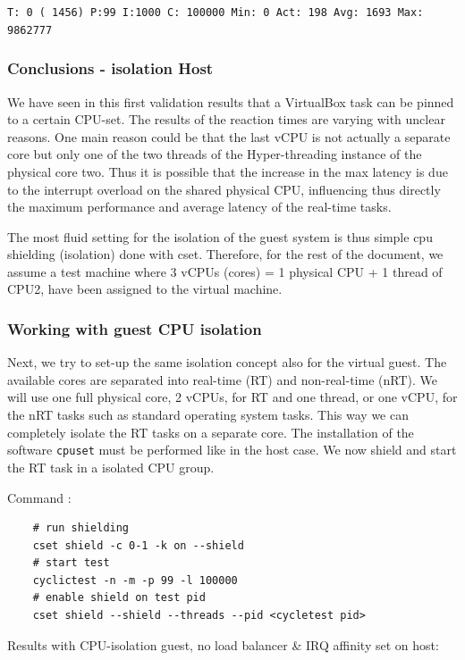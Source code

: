 \documentclass[]{scrartcl}
\begin{document}
\noindent \texttt{T: 0 ( 1456) P:99 I:1000 C: 100000 Min:      0 Act:  198 Avg: 1693 Max:  9862777}

\subsubsection{Conclusions - isolation Host}

We have seen in this first validation results that a VirtualBox task can be pinned to a certain CPU-set. The results of the reaction times are varying with unclear reasons. One main reason could be that the last vCPU is not actually a separate core but only one of the two threads of the Hyper-threading instance of the physical core two. Thus it is possible that the increase in the max latency is due to the interrupt overload on the shared physical CPU, influencing thus directly the maximum performance and average latency of the real-time tasks.

The most fluid setting for the isolation of the guest system is thus simple cpu shielding (isolation) done with cset. Therefore, for the rest of the document, we assume a test machine where 3 vCPUs (cores) = 1 physical CPU + 1 thread of CPU2, have been assigned to the virtual machine.

\subsubsection{Working with guest CPU isolation}
%

Next, we try to set-up the same isolation concept also for the virtual guest. The available cores are separated into real-time (RT) and non-real-time (nRT). We will use one full physical core, 2 vCPUs, for RT and one thread, or one vCPU, for the nRT tasks such as standard operating system tasks. This way we can completely isolate the RT tasks on a separate core. The installation of the software \texttt{cpuset} must be performed like in the host case. We now shield and start the RT task in a isolated CPU group.

\noindent Command : 

\begin{verbatim}
	# run shielding
	cset shield -c 0-1 -k on --shield
	# start test
	cyclictest -n -m -p 99 -l 100000
	# enable shield on test pid
	cset shield --shield --threads --pid <cycletest pid>
\end{verbatim}

\noindent Results with CPU-isolation guest, no load balancer \& IRQ affinity set on host:
\end{document}
